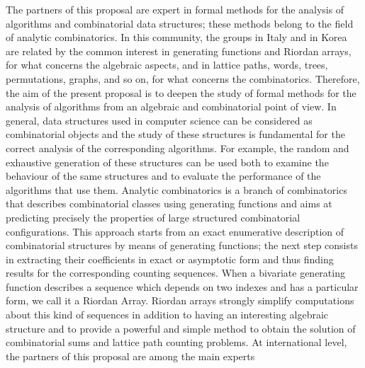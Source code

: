 The partners of this proposal are expert in formal methods for the
analysis of algorithms and combinatorial data structures; these
methods belong to the field of analytic combinatorics. In this
community, the groups in Italy and in Korea are related by the common
interest in generating functions and Riordan arrays, for what concerns
the algebraic aspects, and in lattice paths, words, trees,
permutations, graphs, and so on, for what concerns the
combinatorics. Therefore, the aim of the present proposal is to deepen
the study of formal methods for the analysis of algorithms from an
algebraic and combinatorial point of view. In general, data structures
used in computer science can be considered as combinatorial objects
and the study of these structures is fundamental for the correct
analysis of the corresponding algorithms. For example, the random and
exhaustive generation of these structures can be used both to examine
the behaviour of the same structures and to evaluate the performance
of the algorithms that use them. Analytic combinatorics is a branch of
combinatorics that describes combinatorial classes using generating
functions and aims at predicting precisely the properties of large
structured combinatorial configurations. This approach starts from an
exact enumerative description of combinatorial structures by means of
generating functions; the next step consists in extracting their
coefficients in exact or asymptotic form and thus finding results for
the corresponding counting sequences. When a bivariate generating
function describes a sequence which depends on two indexes and has a
particular form, we call it a Riordan Array. Riordan arrays strongly
simplify computations about this kind of sequences in addition to
having an interesting algebraic structure and to provide a powerful
and simple method to obtain the solution of combinatorial sums and
lattice path counting problems. At international level, the partners
of this proposal are among the main experts


